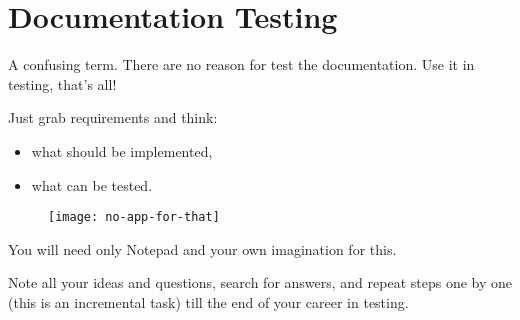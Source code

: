 \section{Documentation Testing}
\label{sec:Documentation Testing}

A confusing term. There are no reason for test the documentation. Use it in testing, that's all!

Just grab requirements and think:
\begin{itemize}
 \item what should be implemented,
 \item what can be tested.
\end{itemize}

\begin{figure}[!h]
\centering
\texttt{[image: no-app-for-that]}
\caption{}
\label{fig:no-app-for-that}
\end{figure}

You will need only  Notepad and your own imagination for this.

Note all your ideas and questions, search for answers, and repeat steps one by one (this is an incremental task) till the end of your career in testing.